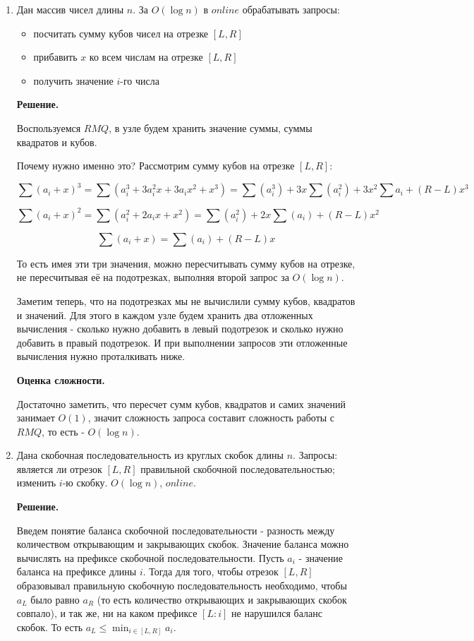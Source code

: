 \begin{enumerate}
	\item Дан массив чисел длины $n$. За $O(\log n)$ в $online$ обрабатывать запросы:
	\begin{itemize}
		\item посчитать сумму кубов чисел на отрезке $[L, R]$
		\item прибавить $x$ ко всем числам на отрезке $[L, R]$
		\item получить значение $i$-го числа
	\end{itemize}
	
	\textbf{Решение.}
	
	Воспользуемся $RMQ$, в узле будем хранить значение суммы, суммы квадратов и кубов.
	
	Почему нужно именно это? Рассмотрим сумму кубов на отрезке $[L, R]$:
	
	$$\sum (a_i + x)^3 = \sum (a_i^3 + 3a_i^2x + 3a_ix^2 + x^3) = \sum (a_i^3) + 3x\sum(a_i^2) + 3x^2\sum a_i + (R-L)x^3$$
	
	$$\sum (a_i + x)^2 = \sum (a_i^2 + 2a_ix + x^2) = \sum (a_i^2) + 2x\sum(a_i) + (R-L)x^2$$
	
	$$\sum (a_i + x) = \sum(a_i) + (R-L)x$$
	
	То есть имея эти три значения, можно пересчитывать сумму кубов на отрезке, не пересчитывая 
	её на подотрезках, выполняя второй запрос за $O(\log n)$. 
	
	Заметим теперь, что на подотрезках мы не вычислили сумму кубов, квадратов и значений. Для 
	этого в каждом узле будем хранить два отложенных вычисления - сколько нужно добавить в 
	левый подотрезок и сколько нужно добавить в правый подотрезок. И при выполнении запросов эти отложенные вычисления нужно проталкивать ниже. 
	
	\textbf{Оценка сложности.} 
	
	Достаточно заметить, что пересчет сумм кубов, квадратов и самих значений занимает $O(1)$, значит сложность запроса составит сложность работы с $RMQ$, то есть - $O(\log n)$.
	
	\item Дана скобочная последовательность из круглых скобок длины $n$. Запросы: является ли 
	отрезок $[L, R]$ правильной скобочной последовательностью; изменить $i$-ю скобку. $O(\log 
	n)$, $online$.
	
	\textbf{Решение.}
	
	Введем понятие баланса скобочной последовательности - разность между количеством 
	открывающим и закрывающих скобок. Значение баланса можно вычислять на префиксе скобочной 
	последовательности. Пусть $a_i$ - значение баланса на префиксе длины $i$. Тогда для того, 
	чтобы отрезок $[L, R]$ образовывал правильную скобочную последовательность необходимо, 
	чтобы $a_L$ было равно $a_R$ (то есть количество открывающих и закрывающих скобок совпало), 
	и так же, ни на каком префиксе $[L:i]$ не нарушился баланс скобок. То есть $a_L \leqslant 
	\min_{i\in[L, R]} a_i$.
	

\end{enumerate}
